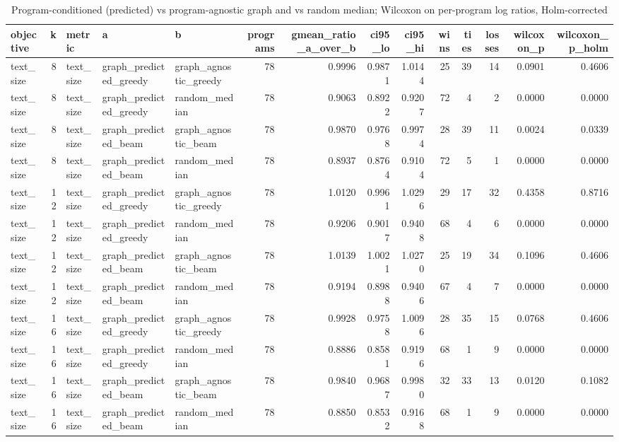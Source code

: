 \begin{table}[t]
\centering
\caption{Program-conditioned (predicted) vs program-agnostic graph and vs random median; Wilcoxon on per-program log ratios, Holm-corrected}
\label{tab:rq3-key-tests}
\begin{tabular}{lrlllrrrrrrrrr}
\toprule
objective & k & metric & a & b & programs & gmean\_ratio\_a\_over\_b & ci95\_lo & ci95\_hi & wins & ties & losses & wilcoxon\_p & wilcoxon\_p\_holm \\
\midrule
text\_size & 8 & text\_size & graph\_predicted\_greedy & graph\_agnostic\_greedy & 78 & 0.9996 & 0.9871 & 1.0144 & 25 & 39 & 14 & 0.0901 & 0.4606 \\
text\_size & 8 & text\_size & graph\_predicted\_greedy & random\_median & 78 & 0.9063 & 0.8922 & 0.9207 & 72 & 4 & 2 & 0.0000 & 0.0000 \\
text\_size & 8 & text\_size & graph\_predicted\_beam & graph\_agnostic\_beam & 78 & 0.9870 & 0.9768 & 0.9974 & 28 & 39 & 11 & 0.0024 & 0.0339 \\
text\_size & 8 & text\_size & graph\_predicted\_beam & random\_median & 78 & 0.8937 & 0.8764 & 0.9104 & 72 & 5 & 1 & 0.0000 & 0.0000 \\
text\_size & 12 & text\_size & graph\_predicted\_greedy & graph\_agnostic\_greedy & 78 & 1.0120 & 0.9961 & 1.0296 & 29 & 17 & 32 & 0.4358 & 0.8716 \\
text\_size & 12 & text\_size & graph\_predicted\_greedy & random\_median & 78 & 0.9206 & 0.9017 & 0.9408 & 68 & 4 & 6 & 0.0000 & 0.0000 \\
text\_size & 12 & text\_size & graph\_predicted\_beam & graph\_agnostic\_beam & 78 & 1.0139 & 1.0021 & 1.0270 & 25 & 19 & 34 & 0.1096 & 0.4606 \\
text\_size & 12 & text\_size & graph\_predicted\_beam & random\_median & 78 & 0.9194 & 0.8988 & 0.9406 & 67 & 4 & 7 & 0.0000 & 0.0000 \\
text\_size & 16 & text\_size & graph\_predicted\_greedy & graph\_agnostic\_greedy & 78 & 0.9928 & 0.9758 & 1.0096 & 28 & 35 & 15 & 0.0768 & 0.4606 \\
text\_size & 16 & text\_size & graph\_predicted\_greedy & random\_median & 78 & 0.8886 & 0.8581 & 0.9196 & 68 & 1 & 9 & 0.0000 & 0.0000 \\
text\_size & 16 & text\_size & graph\_predicted\_beam & graph\_agnostic\_beam & 78 & 0.9840 & 0.9687 & 0.9980 & 32 & 33 & 13 & 0.0120 & 0.1082 \\
text\_size & 16 & text\_size & graph\_predicted\_beam & random\_median & 78 & 0.8850 & 0.8532 & 0.9168 & 68 & 1 & 9 & 0.0000 & 0.0000 \\

\end{tabular}
\end{table}
